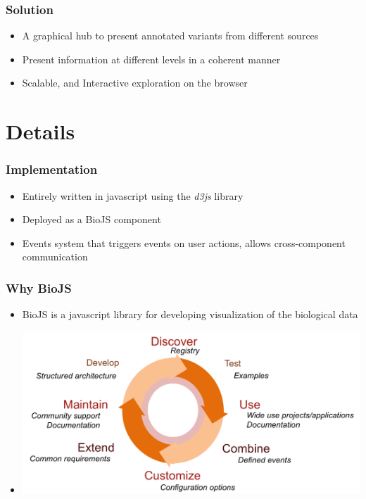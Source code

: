 \documentclass[10pt, compress]{beamer}
\renewcommand{\(}{\begin{columns}}
\renewcommand{\)}{\end{columns}}
\newcommand{\<}[1]{\begin{column}{#1}}
\renewcommand{\>}{\end{column}}
\begin{document}
\begin{frame}[fragile]
\frametitle{Solution}

  \begin{itemize}[<+- | alert@+>]
    \item A graphical hub to present annotated variants from different sources
   	\item Present information at different levels in a coherent manner
   	\item Scalable,  and Interactive exploration on the browser
   	
  \end{itemize}
\end{frame}




\section{Details}

\begin{frame}
\frametitle{Implementation}
\begin{itemize}[<+- | alert@+>]
\item Entirely written in javascript using the \textit{d3js} library
\item Deployed as a BioJS component
\item Events system that triggers events on user actions, allows cross-component communication

 \end{itemize}
\end{frame}

\begin{frame}
\frametitle{Why BioJS}
\begin{itemize}[<+- | alert@+>]
\item BioJS is a javascript library for developing visualization of the biological data
\item 
\includegraphics[width=\linewidth]{images/cycle}

\end{itemize}
\end{frame}
\end{document}
